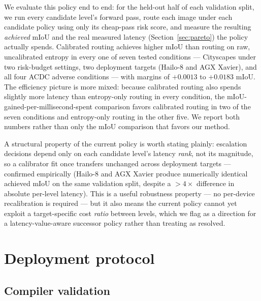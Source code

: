 \documentclass[a4paper,review,12pt]{elsarticle}
\begin{document}
We evaluate this policy end to end: for the held-out half of each validation
split, we run every candidate level's forward pass, route each image under
each candidate policy using only its cheap-pass risk score, and measure the
resulting \emph{achieved} mIoU and the real measured latency
(Section~\ref{sec:pareto}) the policy actually spends. Calibrated routing
achieves higher mIoU than routing on raw, uncalibrated entropy in every one of
seven tested conditions --- Cityscapes under two risk-budget settings, two
deployment targets (Hailo-8 and AGX Xavier), and all four ACDC adverse
conditions --- with margins of $+0.0013$ to $+0.0183$ mIoU. The efficiency
picture is more mixed: because calibrated routing also spends slightly more
latency than entropy-only routing in every condition, the
mIoU-gained-per-millisecond-spent comparison favors calibrated routing in two
of the seven conditions and entropy-only routing in the other five. We report
both numbers rather than only the mIoU comparison that favors our method.

A structural property of the current policy is worth stating plainly:
escalation decisions depend only on each candidate level's latency
\emph{rank}, not its magnitude, so a calibrator fit once transfers unchanged
across deployment targets --- confirmed empirically (Hailo-8 and AGX Xavier
produce numerically identical achieved mIoU on the same validation split,
despite a $>\!4\times$ difference in absolute per-level latency). This is a
useful robustness property --- no per-device recalibration is required --- but
it also means the current policy cannot yet exploit a target-specific cost
\emph{ratio} between levels, which we flag as a direction for a
latency-value-aware successor policy rather than treating as resolved.

\section{Deployment protocol}
\label{sec:deployment}

\subsection{Compiler validation}
\label{sec:compiler-validation}
\end{document}

